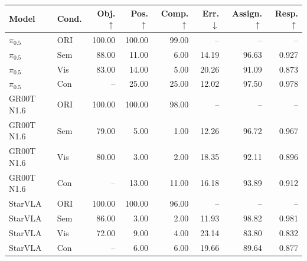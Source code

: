 \begin{center}
\setlength{\belowcaptionskip}{\baselineskip}
\label{tab:diagnostics}
\normalsize
\setlength{\tabcolsep}{4pt}
\renewcommand{\arraystretch}{1.10}
\begin{tabular}{@{}llrrrrrr@{}}
\toprule
Model & Cond. & Obj.$\uparrow$ & Pos.$\uparrow$ & Comp.$\uparrow$ &
Err.$\downarrow$ & Assign.$\uparrow$ & Resp.$\uparrow$ \\
\midrule
$\pi_{0.5}$ & ORI & 100.00 & 100.00 & 99.00 & -- & -- & -- \\
$\pi_{0.5}$ & Sem & 88.00 & 11.00 & 6.00 & 14.19 & 96.63 & 0.927 \\
$\pi_{0.5}$ & Vis & 83.00 & 14.00 & 5.00 & 20.26 & 91.09 & 0.873 \\
$\pi_{0.5}$ & Con & -- & 25.00 & 25.00 & 12.02 & 97.50 & 0.978 \\
GR00T N1.6 & ORI & 100.00 & 100.00 & 98.00 & -- & -- & -- \\
GR00T N1.6 & Sem & 79.00 & 5.00 & 1.00 & 12.26 & 96.72 & 0.967 \\
GR00T N1.6 & Vis & 80.00 & 3.00 & 2.00 & 18.35 & 92.11 & 0.896 \\
GR00T N1.6 & Con & -- & 13.00 & 11.00 & 16.18 & 93.89 & 0.912 \\
StarVLA & ORI & 100.00 & 100.00 & 96.00 & -- & -- & -- \\
StarVLA & Sem & 86.00 & 3.00 & 2.00 & 11.93 & 98.82 & 0.981 \\
StarVLA & Vis & 72.00 & 9.00 & 4.00 & 23.14 & 83.80 & 0.832 \\
StarVLA & Con & -- & 6.00 & 6.00 & 19.66 & 89.64 & 0.877 \\
\bottomrule
\end{tabular}
\end{center}
